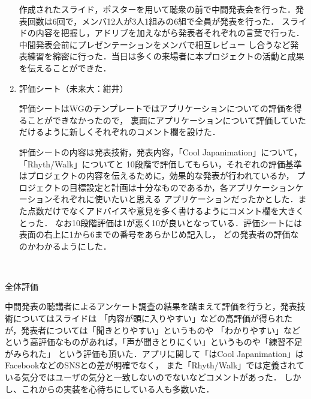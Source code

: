 \begin{enumerate}
\par
作成されたスライド，ポスターを用いて聴衆の前で中間発表会を行った．発表回数は6回で，メンバ12人が3人1組みの6組で全員が発表を行った．
スライドの内容を把握し，アドリブを加えながら発表者それぞれの言葉で行った．中間発表会前にプレゼンテーションをメンバで相互レビュー
し合うなど発表練習を綿密に行った．当日は多くの来場者に本プロジェクトの活動と成果を伝えることができた．
\item 評価シート（未来大：紺井）
\par
評価シートはWGのテンプレートではアプリケーションについての評価を得ることができなかったので，
裏面にアプリケーションについて評価していただけるように新しくそれぞれのコメント欄を設けた．
\par 評価シートの内容は発表技術，発表内容，「Cool Japanimation」について，「Rhyth/Walk」についてと
10段階で評価してもらい，それぞれの評価基準はプロジェクトの内容を伝えるために，効果的な発表が行われているか，
プロジェクトの目標設定と計画は十分なものであるか，各アプリケーションケーションそれぞれに使いたいと思える
アプリケーションだったかとした．また点数だけでなくアドバイスや意見を多く書けるようにコメント欄を大きくとった．
なお10段階評価は1が悪く10が良いとなっている．評価シートには表面の右上に1から6までの番号をあらかじめ記入し，
どの発表者の評価なのかわかるようにした．
\end{enumerate}　
\par
全体評価
\par
中間発表の聴講者によるアンケート調査の結果を踏まえて評価を行うと，発表技術についてはスライドは
「内容が頭に入りやすい」などの高評価が得られたが，発表者については「聞きとりやすい」というものや
「わかりやすい」などという高評価なものがあれば，「声が聞きとりにくい」というものや「練習不足がみられた」
という評価も頂いた．アプリに関して「はCool Japanimation」はFacebookなどのSNSとの差が明確でなく，
また「Rhyth/Walk」では定義されている気分ではユーザの気分と一致しないのでないなどコメントがあった．
しかし、これからの実装を心待ちにしている人も多数いた．

